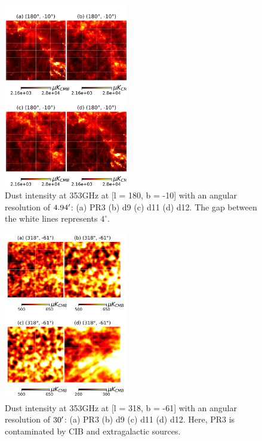 \documentclass[twocolumn]{aastex631}
\begin{document}
\begin{figure}[ht!]
    \centering
    \includegraphics[width=0.48\textwidth]{figures/gal_plane_non_smooth_wo_zero_lvl.png}
\caption{Dust intensity at 353GHz at [l = 180, b = -10] with an angular resolution of $4.94\mbox{$^\prime$}$: (a) PR3 (b) d9 (c) d11 (d) d12. The gap between the white lines represents $4^{\circ}$. }    
\label{fig:353_int_gal_plane}
\end{figure}
\begin{figure}[ht!]
    \centering
    \includegraphics[width=0.48\textwidth]{figures/BK_smooth_30'_wo_zero_lvl.png}
    \caption{Dust intensity at 353GHz at [l = 318, b = -61] with an angular resolution of $30\mbox{$^\prime$}$: (a) PR3 (b) d9 (c) d11 (d) d12. Here, PR3 is contaminated by CIB and extragalactic sources.}
    \label{fig:353_int_BK}
\end{figure}
\end{document}
